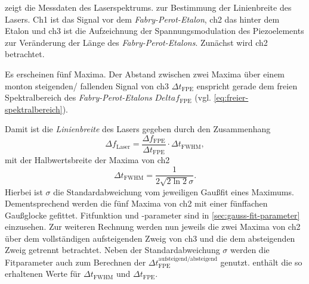 \documentclass[../bericht.tex]{subfiles}
\begin{document}
         zeigt die Messdaten des Laserspektrums. zur Bestimmung der Linienbreite des Lasers. Ch1 ist das Signal vor dem \textit{Fabry-Perot-Etalon}, ch2 das hinter dem Etalon und ch3 ist die Aufzeichnung der Spannungsmodulation des Piezoelements zur Veränderung der Länge des \textit{Fabry-Perot-Etalons}. Zunächst wird ch2 betrachtet.

        Es erscheinen fünf Maxima. Der Abstand zwischen zwei Maxima über einem monton steigenden/ fallenden Signal von ch3 $\Delta t_\mathrm{FPE}$ enspricht gerade dem freien Spektralbereich des \textit{Fabry-Perot-Etalons} $Delta f_\mathrm{FPE}$ (vgl. \cref{eq:freier-spektralbereich}).

        Damit ist die \textit{Linienbreite} des Lasers gegeben durch den Zusammenhang
        \begin{equation}
          \Delta f_\mathrm{Laser} = \frac{\Delta f_\mathrm{FPE}}{\Delta t_\mathrm{FPE}}\cdot \Delta t_\mathrm{FWHM},
          \label{eq:deltaf-laser}
        \end{equation}
        mit der Halbwertsbreite der Maxima von ch2
        \begin{equation*}
          \Delta t_\mathrm{FWHM}=\frac{1}{2\sqrt{2\ln 2}\sigma}.
        \end{equation*}
        Hierbei ist $\sigma$ die Standardabweichung vom jeweiligen Gau\ss{}fit eines Maximums. Dementsprechend werden die fünf Maxima von ch2 mit einer fünffachen Gau\ss{}glocke gefittet. Fitfunktion und -parameter sind in \cref{sec:gauss-fit-parameter} einzusehen. Zur weiteren Rechnung werden nun jeweils die zwei Maxima von ch2 über dem vollständigen aufsteigenden Zweig von ch3 und die dem absteigenden Zweig getrennt betrachtet. Neben der Standardabweichung $\sigma$ werden die Fitparameter auch zum Berechnen der $\Delta t_\mathrm{FPE}^\mathrm{aufsteigend/absteigend}$ genutzt.  enthält die so erhaltenen Werte für $\Delta t_\mathrm{FWHM}$ und $\Delta t_\mathrm{FPE}$.
\end{document}
